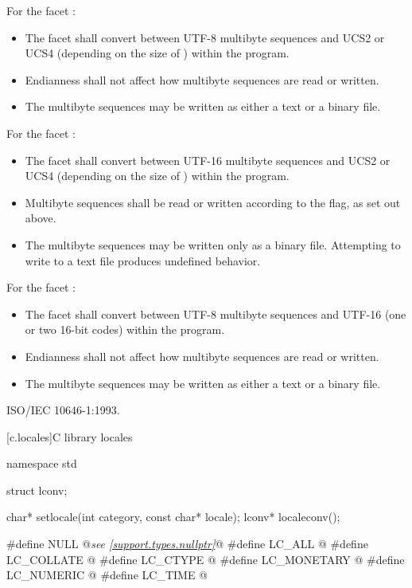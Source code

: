 \pnum
For the facet :

\begin{itemize}
\item The facet shall convert between UTF-8 multibyte sequences and UCS2 or UCS4 (depending on the size of ) within the program.
\item Endianness shall not affect how multibyte sequences are read or written.
\item The multibyte sequences may be written as either a text or a binary file.
\end{itemize}

\pnum
For the facet :

\begin{itemize}
\item The facet shall convert between UTF-16 multibyte sequences and UCS2 or UCS4 (depending on the size of ) within the program.
\item Multibyte sequences shall be read or written according to the  flag, as set out above.
\item The multibyte sequences may be written only as a binary file. Attempting to write to a text file produces undefined behavior.
\end{itemize}

\pnum
For the facet :

\begin{itemize}
\item The facet shall convert between UTF-8 multibyte sequences and UTF-16 (one or two 16-bit codes) within the program.
\item Endianness shall not affect how multibyte sequences are read or written.
\item The multibyte sequences may be written as either a text or a binary file.
\end{itemize}

\xref ISO/IEC 10646-1:1993.

[c.locales]{C library locales}


%
%
%
%
%
%
%
%
%
%
%
\begin{codeblock}
namespace std {
  struct lconv;

  char* setlocale(int category, const char* locale);
  lconv* localeconv();
}

#define NULL @\textit{see \ref{support.types.nullptr}}@
#define LC_ALL @\seebelow@
#define LC_COLLATE @\seebelow@
#define LC_CTYPE @\seebelow@
#define LC_MONETARY @\seebelow@
#define LC_NUMERIC @\seebelow@
#define LC_TIME @\seebelow@
\end{codeblock}

